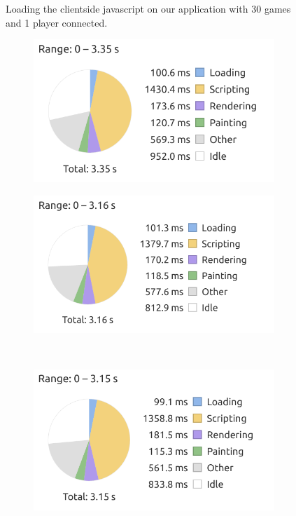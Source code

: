 \begin{figure}[H]
    \caption{Loading the clientside javascript on our application with 30 games and 1 player connected.}
\end{figure}

\begin{figure}[H]
    \centering
    \begin{subfigure}{0.49\textwidth}
        \includegraphics[width=\textwidth]{figure/clientsidePerformance/graph90games1.png}
    \end{subfigure}
    \begin{subfigure}{0.49\textwidth}
        \includegraphics[width=\textwidth]{figure/clientsidePerformance/graph90games2.png}
    \end{subfigure}
    \\
    \begin{subfigure}{0.5\textwidth}
        \includegraphics[width=\textwidth]{figure/clientsidePerformance/graph90games3.png}
    \end{subfigure}
    

\end{figure}
